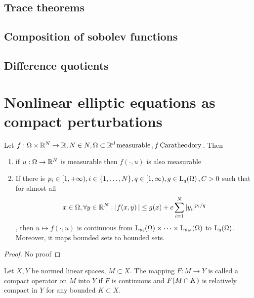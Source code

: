 \documentclass{article}
\begin{document}
\subsection{Trace theorems}
\label{sec:traces}

\subsection{Composition of sobolev functions}
\label{sec:composition}

\subsection{Difference quotients}
\label{sec:difference_quotients}

\section{Nonlinear elliptic equations as compact perturbations}
\label{sec:nonlinear_elliptic_compact}

\begin{theorem}[Nemytskii]
	Let $f: \Omega \times {\mathbb R}^N \to {\mathbb R}, N \in N, \Omega \subset {\mathbb R}^d \, \text{measurable} \,, f \, \text{Caratheodory} \,$. Then
	\begin{enumerate}
		\item if $u: \Omega \to {\mathbb R}^N$ is measurable then $f(\cdot, u)$ is also measurable
		\item If there is $p_i \in [1, +\infty), i \in \{1,\dots,N\}, q \in [1, \infty), g \in \LpSet[q]{\Omega}, C>0$ such that for almost all
			\[
				x \in \Omega, \forall y \in {\mathbb R}^N: |f\qty(x,y)| \leq g(x) + c \sum_{i=1}^N |y_i|^{p_i/q}
			\]
			, then $u \mapsto f(\cdot, u)$ is continuous from $\LpSet[p_i]{\Omega} \times \dots \times \LpSet[p_N]{\Omega}$ to $\LpSet[q]{\Omega}$. Moreover, it maps bounded sets to bounded sets.
	\end{enumerate}
\end{theorem}
\begin{proof}
	No proof
\end{proof}

\begin{definition}
	Let $X,Y$ be normed linear spaces, $M \subset X.$ The mapping $F:M \to Y$ is called a compact operator on $M$ into $Y$ if $F$ is continuous and $F\qty(M \cap K)$ is relatively compact in $Y$ for any bounded $K \subset X.$
\end{definition}
\end{document}
